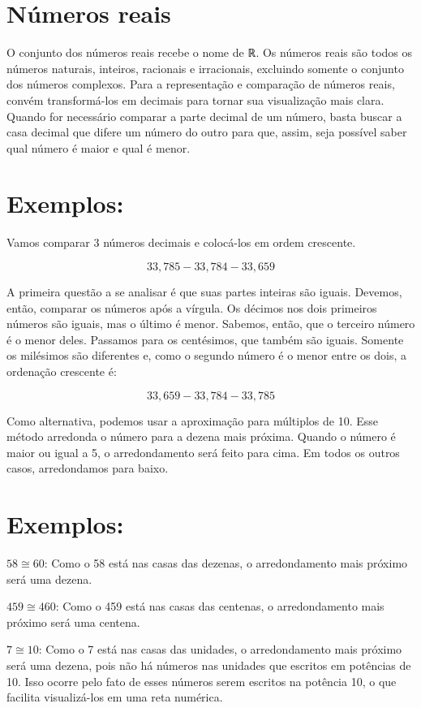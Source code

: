 \section{Números reais}

O conjunto dos números reais recebe o nome de ℝ. Os números reais são
todos os números naturais, inteiros, racionais e irracionais, excluindo
somente o conjunto dos números complexos. Para a representação e
comparação de números reais, convém transformá-los em decimais para
tornar sua visualização mais clara. Quando for necessário comparar a
parte decimal de um número, basta buscar a casa decimal que difere um
número do outro para que, assim, seja possível saber qual número é maior
e qual é menor.

\section{Exemplos:}

Vamos comparar 3 números decimais e colocá-los em ordem crescente.

$$33,785  - 33,784  - 33,659$$

A primeira questão a se analisar é que suas partes inteiras são iguais.
Devemos, então, comparar os números após a vírgula. Os décimos nos dois
primeiros números são iguais, mas o último é menor. Sabemos, então, que
o terceiro número é o menor deles. Passamos para os centésimos, que
também são iguais. Somente os milésimos são diferentes e, como o segundo
número é o menor entre os dois, a ordenação crescente é:

$$33,659  - 33,784  - 33,785$$

Como alternativa, podemos usar a aproximação para múltiplos de 10. Esse
método arredonda o número para a dezena mais próxima. Quando o número é
maior ou igual a 5, o arredondamento será feito para cima. Em todos os
outros casos, arredondamos para baixo.

\section{Exemplos:}

$58\cong 60$: Como o 58 está nas casas das dezenas, o
arredondamento mais próximo será uma dezena.

$459\cong 460$: Como o 459 está nas casas das centenas, o
arredondamento mais próximo será uma centena.

$7\cong 10$: Como o 7 está nas casas das unidades, o
arredondamento mais próximo será uma dezena, pois não há números nas
unidades que escritos em potências de 10. Isso ocorre pelo fato de esses
números serem escritos na potência 10, o que facilita visualizá-los em
uma reta numérica.

